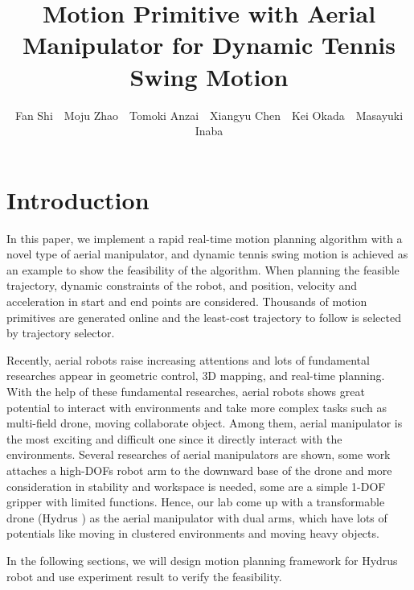 \documentclass{jarticle}
\begin{document}
\title{Motion Primitive with Aerial Manipulator for Dynamic Tennis Swing Motion}
\author{Fan Shi\ \ Moju Zhao\ \ Tomoki Anzai\ \ Xiangyu Chen\ \ Kei Okada\ \ Masayuki Inaba}

\setlength{\baselineskip}{4.4mm}
\maketitle
\thispagestyle{empty}
\pagestyle{empty}

\section{Introduction}

In this paper, we implement a rapid real-time motion planning algorithm with a novel type of aerial manipulator, and dynamic tennis swing motion is achieved as an example to show the feasibility of the algorithm. When planning the feasible trajectory, dynamic constraints of the robot, and position, velocity and acceleration in start and end points are considered. Thousands of motion primitives are generated online and the least-cost trajectory to follow is selected by trajectory selector.

Recently, aerial robots raise increasing attentions and lots of fundamental researches appear in geometric control, 3D mapping,  and real-time planning. With the help of these fundamental researches, aerial robots shows great potential to interact with environments and take more complex tasks such as multi-field drone, moving collaborate object. Among them, aerial manipulator is the most exciting and difficult one since it directly interact with the environments. Several researches of aerial manipulators are shown, some work attaches a high-DOFs robot arm to the downward base of the drone and more consideration in stability and workspace is needed\cite{aerial_manipulator_1}, some are a simple 1-DOF gripper with limited functions\cite{aerial_manipulator_2}. Hence, our lab come up with a transformable drone (Hydrus ) as the aerial manipulator with dual arms, which have lots of potentials like moving in clustered environments and moving heavy objects\cite{zhao_ar}\cite{zhao_iser}.

In the following sections, we will design motion planning framework for Hydrus robot and use experiment result to verify the feasibility.
\end{document}
